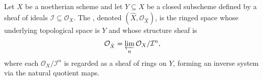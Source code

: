 Let $X$ be a noetherian scheme and let $Y \subseteq X$ be a closed subscheme defined by a sheaf of ideals $\mathcal{I} \subseteq \mathcal{O}_X$. The , denoted $(\hat{X}, \mathcal{O}_{\hat{X}})$, is the ringed space whose underlying topological space is $Y$ and whose structure sheaf is
$$\mathcal{O}_{\hat{X}} = \varprojlim_{n} \mathcal{O}_X / \mathcal{I}^n,$$
where each $\mathcal{O}_X / \mathcal{I}^n$ is regarded as a sheaf of rings on $Y$, forming an inverse system via the natural quotient maps.
